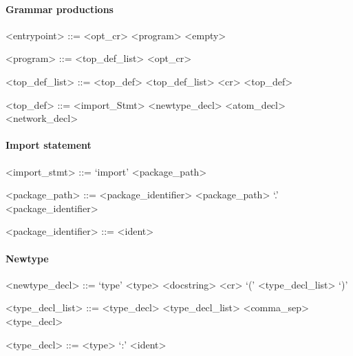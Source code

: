 \paragraph{Grammar productions}

\begin{grammar}
  <entrypoint> ::= <opt_cr> <program>
  \alt <empty>

  <program> ::= <top_def_list> <opt_cr>

  <top_def_list> ::= <top_def>
  \alt <top_def_list> <cr> <top_def>

  <top_def> ::= <import_Stmt>
  \alt <newtype_decl>
  \alt <atom_decl>
  \alt <network_decl>
\end{grammar}


\paragraph{Import statement}

\begin{grammar}
  <import_stmt> ::= `import' <package_path>

  <package_path> ::= <package_identifier>
  \alt <package_path> `.' <package_identifier>

  <package_identifier> ::= <ident>
\end{grammar}


\paragraph{Newtype}

\begin{grammar}
  <newtype_decl> ::= `type' <type> <docstring> <cr> `('
  <type_decl_list> `)'

  <type_decl_list> ::= <type_decl>
  \alt <type_decl_list> <comma_sep> <type_decl>

  <type_decl> ::= <type> `:' <ident>
\end{grammar}


